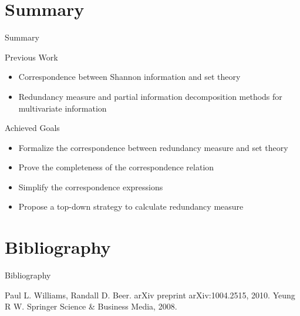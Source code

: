 \section*{Summary}

\begin{frame}{Summary}
  \begin{block}{Previous Work}
    \begin{itemize}
    \item Correspondence between Shannon information and set theory
    \item Redundancy measure and partial information decomposition methods for multivariate information
    \end{itemize}
  \end{block}


  \begin{block}{Achieved Goals}
    \begin{itemize}
    \item Formalize the correspondence between redundancy measure and set theory
    \item Prove the completeness of the correspondence relation
    \item Simplify the correspondence expressions
    \item Propose a top-down strategy to calculate redundancy measure
    \end{itemize}
  \end{block}
\end{frame}

\section*{Bibliography}
\begin{frame}{Bibliography}
  \begin{thebibliography}{10}

    Paul L. Williams, Randall D. Beer.
    \newblock arXiv preprint arXiv:1004.2515, 2010.
    Yeung R W.
    \newblock Springer Science \& Business Media, 2008.
  \end{thebibliography}
\end{frame}






